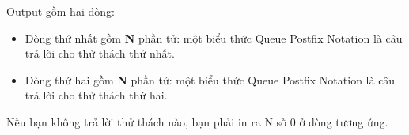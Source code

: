 Output gồm hai dòng:  
\begin{itemize}
	\item     Dòng thứ nhất gồm    \textbf{     N    }    phần tử: một biểu thức Queue Postfix Notation là câu trả lời cho thử thách thứ nhất.   
	\item     Dòng thứ hai gồm    \textbf{     N    }    phần tử: một biểu thức Queue Postfix Notation là câu trả lời cho thử thách thứ hai.   
\end{itemize}

   Nếu bạn không trả lời thử thách nào, bạn phải in ra N số 0 ở dòng tương ứng.